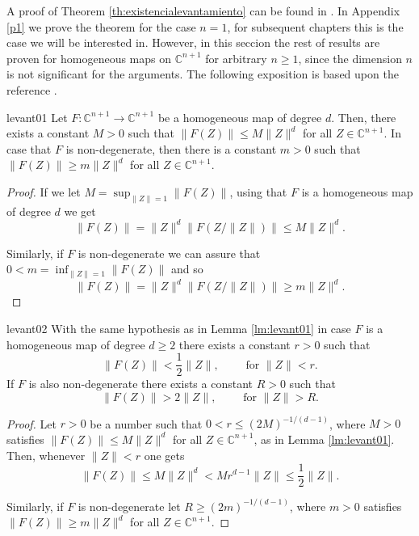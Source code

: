 A proof of Theorem \ref{th:existencialevantamiento} can be found in \cite{fornaes}. In Appendix \ref{p1} we prove the theorem for the case $n=1$, for subsequent chapters this is the case we will be interested in. However, in this seccion the rest of results are proven for homogeneous maps on $\mathbb{C}^{n+1}$ for arbitrary $n\geq 1$, since the dimension $n$ is not significant for the arguments. The following exposition is based upon the reference \cite{ueda}.\\

\begin{mylema}{}{levant01}
Let $F: \mathbb{C}^{n+1} \rightarrow \mathbb{C}^{n+1}$ be a homogeneous map of degree $d$. Then, there exists a constant $M>0$ such that $\|F(Z)\| \leq M \|Z\|^d$ for all $Z\in \mathbb{C}^{n+1}$. In case that $F$ is non-degenerate, then there is a constant $m>0$ such that $\|F(Z)\| \geq m \|Z\|^d$ for all $Z\in \mathbb{C}^{n+1}$. 
\end{mylema}

\begin{proof}
If we let $M = \sup_{\|Z\|=1} \|F(Z)\|$, using that $F$ is a homogeneous map of degree $d$ we get
$$\| F(Z)\|  = \|Z\|^d \| F(Z/\|Z\|) \| \leq M \|Z\|^d.$$

Similarly, if $F$ is non-degenerate we can assure that $0<m = \inf_{\|Z\|=1} \|F(Z)\|$ and so
$$\| F(Z)\|  = \|Z\|^d \| F(Z/\|Z\|) \| \geq m \|Z\|^d.$$
\end{proof}

\begin{mylema}{}{levant02}
With the same hypothesis as in Lemma \ref{lm:levant01} in case $F$ is a homogeneous map of degree $d \geq 2$ there exists a constant $r>0$ such that
$$\|F(Z)\| < \frac{1}{2}\|Z\|, \qquad \text{ for } \|Z\| < r.$$
If $F$ is also non-degenerate there exists a constant $R>0$ such that 
$$\|F(Z)\| > 2\|Z\|, \qquad \text{ for }\|Z\| > R.$$
\end{mylema}

\begin{proof}
Let $r>0$ be a number such that $0<r \leq (2M)^{-1/(d-1)}$, where $M>0$ satisfies $\|F(Z)\| \leq M \|Z\|^d$ for all $Z\in \mathbb{C}^{n+1}$, as in Lemma \ref{lm:levant01}. Then, whenever $\|Z\|<r$ one gets
$$\|F(Z)\| \leq M\|Z\|^d < M r^{d-1}\|Z\| \leq \frac{1}{2} \|Z\|.$$

Similarly, if $F$ is non-degenerate let $R \geq (2m)^{-1/(d-1)}$, where $m>0$ satisfies $\|F(Z)\| \geq m \|Z\|^d$ for all $Z\in \mathbb{C}^{n+1}$.
\end{proof}

